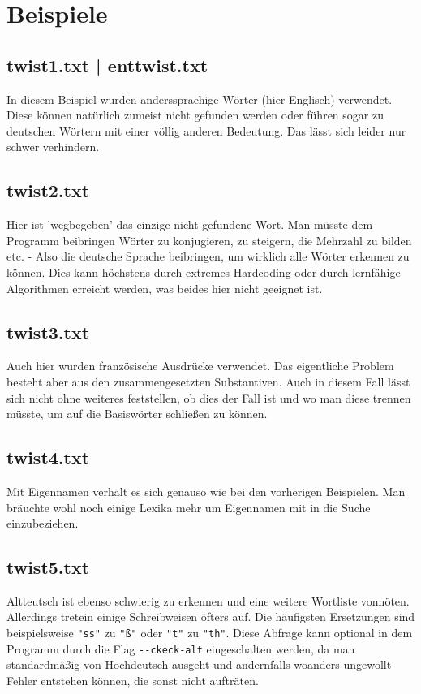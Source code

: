 \documentclass[a4paper,10pt,ngerman]{scrartcl}
\newcommand{\newsection}{\vspace{3\baselineskip}\section}
\begin{document}
\newsection{Beispiele}

\vspace{1\baselineskip}
\subsection[twist1.txt]{twist1.txt | enttwist.txt}
In diesem Beispiel wurden anderssprachige Wörter (hier Englisch) verwendet. Diese können natürlich zumeist nicht gefunden werden oder führen sogar zu deutschen Wörtern mit einer völlig anderen Bedeutung. Das lässt sich leider nur schwer verhindern.


\vspace{1\baselineskip}
\subsection{twist2.txt}
Hier ist 'wegbegeben' das einzige nicht gefundene Wort. Man müsste dem Programm beibringen Wörter zu konjugieren, zu steigern, die Mehrzahl zu bilden etc. - Also die deutsche Sprache beibringen, um wirklich alle Wörter erkennen zu können. Dies kann höchstens durch extremes Hardcoding oder durch lernfähige Algorithmen erreicht werden, was beides hier nicht geeignet ist.


\vspace{1\baselineskip}
\subsection{twist3.txt}
Auch hier wurden französische Ausdrücke verwendet. Das eigentliche Problem besteht aber aus den zusammengesetzten Substantiven. Auch in diesem Fall lässt sich nicht ohne weiteres feststellen, ob dies der Fall ist und wo man diese trennen müsste, um auf die Basiswörter schließen zu können.


\vspace{1\baselineskip}
\subsection{twist4.txt}
Mit Eigennamen verhält es sich genauso wie bei den vorherigen Beispielen. Man bräuchte wohl noch einige Lexika mehr um Eigennamen mit in die Suche einzubeziehen.


\vspace{1\baselineskip}
\subsection{twist5.txt}
Altteutsch ist ebenso schwierig zu erkennen und eine weitere Wortliste vonnöten. Allerdings tretein einige Schreibweisen öfters auf. Die häufigsten Ersetzungen sind beispielsweise \lstinline{"ss"} zu \lstinline{"ß"} oder \lstinline{"t"} zu \lstinline{"th"}. Diese Abfrage kann optional in dem Programm durch die Flag \lstinline{--ckeck-alt} eingeschalten werden, da man standardmäßig von Hochdeutsch ausgeht und andernfalls woanders ungewollt Fehler entstehen können, die sonst nicht aufträten.
\end{document}

